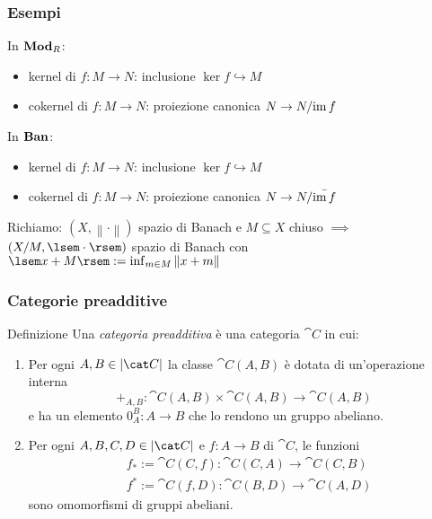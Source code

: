 \documentclass{beamer}
\begin{document}
\begin{frame}
  \frametitle{Esempi}
  In \(\mathbf{Mod}_R\):
  \begin{itemize}
  \item kernel di \(f : M \to N\): inclusione \(\ker f \hookrightarrow M\)
  \item cokernel di \(f : M \to N\): proiezione canonica
    \(N \to N{/}{\operatorname{im} f}\)
  \end{itemize}

  In \(\mathbf{Ban}\):
  \begin{itemize}
  \item kernel di \(f : M \to N\): inclusione \(\ker f \hookrightarrow M\)
  \item cokernel di \(f : M \to N\): proiezione canonica
    \(N \to N{/}{\bar{\operatorname{im} f}}\)
  \end{itemize}

  Richiamo: \((X, \left\lVert \cdot \right\rVert)\) spazio di Banach e
  \(M \subseteq X\) chiuso \(\implies\) \((X/M, \lsem \cdot \rsem)\) spazio di
  Banach con
  \(\lsem x+M \rsem := \inf_{m \in M} \left\lVert x+m \right\rVert\)
\end{frame}

\begin{frame}
  \frametitle{Categorie preadditive}

\begin{block}{Definizione}
  Una {\em categoria preadditiva} è una categoria \(\cat C\) in cui:
  \begin{enumerate}%
  \item Per ogni \(A, B \in \obj{\cat C}\) la classe \(\cat C(A, B)\) è
    dotata di un'operazione interna
    \[
      +_{A,B} : \cat C (A, B) \times \cat C (A, B) \to \cat C (A, B)
    \]
    e ha un elemento \(0_A^B : A \to B\) che lo rendono un gruppo
    abeliano.
  \item Per ogni \(A, B, C, D \in \obj{\cat C}\) e \(f : A \to B\) di
    \(\cat C\), le funzioni
    \begin{align*}
      & f_\ast := \cat C(C, f) : \cat C(C, A) \to \cat C(C, B) \\
      & f^\ast := \cat C(f, D) : \cat C(B, D) \to \cat C(A, D)
    \end{align*}
    sono omomorfismi di gruppi abeliani.
  \end{enumerate}
\end{block}
  
\end{frame}
\end{document}
